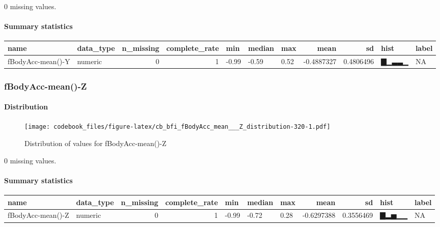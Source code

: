 \documentclass[
]{article}
\begin{document}
0 missing values.

\hypertarget{fBodyAcc_mean___Y_summary}{%
\paragraph{Summary statistics}\label{fBodyAcc_mean___Y_summary}}

\begin{longtable}[]{@{}llrrlllrrll@{}}
\toprule
name & data\_type & n\_missing & complete\_rate & min & median & max &
mean & sd & hist & label \\
\midrule
\endhead
fBodyAcc-mean()-Y & numeric & 0 & 1 & -0.99 & -0.59 & 0.52 & -0.4887327
& 0.4806496 & ▇▁▃▃▁ & NA \\
\bottomrule
\end{longtable}

\hypertarget{fBodyAcc_mean___Z}{%
\subsubsection{fBodyAcc-mean()-Z}\label{fBodyAcc_mean___Z}}

\hypertarget{fBodyAcc_mean___Z_distribution}{%
\paragraph{Distribution}\label{fBodyAcc_mean___Z_distribution}}

\begin{figure}
\centering
\texttt{[image: codebook\_files/figure-latex/cb\_bfi\_fBodyAcc\_mean\_\_\_Z\_distribution-320-1.pdf]}
\caption{Distribution of values for fBodyAcc-mean()-Z}
\end{figure}

0 missing values.

\hypertarget{fBodyAcc_mean___Z_summary}{%
\paragraph{Summary statistics}\label{fBodyAcc_mean___Z_summary}}

\begin{longtable}[]{@{}llrrlllrrll@{}}
\toprule
name & data\_type & n\_missing & complete\_rate & min & median & max &
mean & sd & hist & label \\
\midrule
\endhead
fBodyAcc-mean()-Z & numeric & 0 & 1 & -0.99 & -0.72 & 0.28 & -0.6297388
& 0.3556469 & ▇▂▅▁▁ & NA \\
\bottomrule
\end{longtable}
\end{document}
